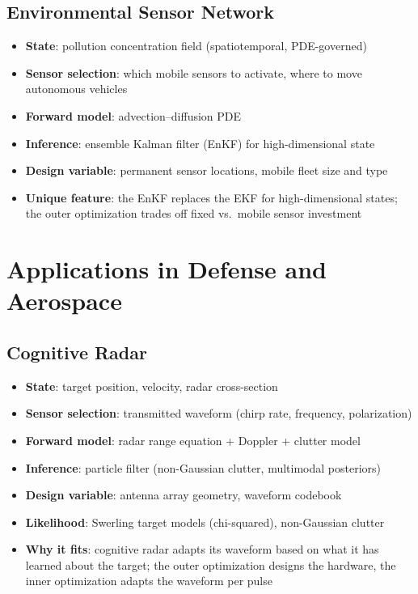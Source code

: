 \documentclass[11pt,a4paper]{article}
\begin{document}
\subsection{Environmental Sensor Network}

\begin{itemize}[nosep]
  \item \textbf{State}: pollution concentration field (spatiotemporal, PDE-governed)
  \item \textbf{Sensor selection}: which mobile sensors to activate, where to move autonomous vehicles
  \item \textbf{Forward model}: advection--diffusion PDE
  \item \textbf{Inference}: ensemble Kalman filter (EnKF) for high-dimensional state
  \item \textbf{Design variable}: permanent sensor locations, mobile fleet size and type
  \item \textbf{Unique feature}: the EnKF replaces the EKF for high-dimensional states; the outer optimization trades off fixed vs.\ mobile sensor investment
\end{itemize}

\section{Applications in Defense and Aerospace}

\subsection{Cognitive Radar}

\begin{itemize}[nosep]
  \item \textbf{State}: target position, velocity, radar cross-section
  \item \textbf{Sensor selection}: transmitted waveform (chirp rate, frequency, polarization)
  \item \textbf{Forward model}: radar range equation + Doppler + clutter model
  \item \textbf{Inference}: particle filter (non-Gaussian clutter, multimodal posteriors)
  \item \textbf{Design variable}: antenna array geometry, waveform codebook
  \item \textbf{Likelihood}: Swerling target models (chi-squared), non-Gaussian clutter
  \item \textbf{Why it fits}: cognitive radar adapts its waveform based on what it has learned about the target; the outer optimization designs the hardware, the inner optimization adapts the waveform per pulse
\end{itemize}
\end{document}

